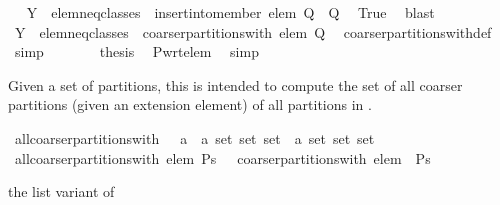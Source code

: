 \begin{isabellebody}
\ \isamarkupfalse%
\ {\isachardoublequoteopen}{\isacharbraceleft}Y{\isacharbraceright}\ {\isasymunion}\ {\isacharquery}elem{\isacharunderscore}neq{\isacharunderscore}classes\ {\isasymin}\ insert{\isacharunderscore}into{\isacharunderscore}member\ elem\ {\isacharquery}Q\ {\isacharbackquote}\ {\isacharquery}Q{\isachardoublequoteclose}\ \isamarkupfalse%
\ True\ \isamarkupfalse%
\ blast\isanewline
\ \ \ \ \isamarkupfalse%
\ \isamarkupfalse%
\ {\isachardoublequoteopen}{\isacharbraceleft}Y{\isacharbraceright}\ {\isasymunion}\ {\isacharquery}elem{\isacharunderscore}neq{\isacharunderscore}classes\ {\isasymin}\ coarser{\isacharunderscore}partitions{\isacharunderscore}with\ elem\ {\isacharquery}Q{\isachardoublequoteclose}\ \isamarkupfalse%
\ coarser{\isacharunderscore}partitions{\isacharunderscore}with{\isacharunderscore}def\ \isamarkupfalse%
\ simp\isanewline
\ \ \ \ \isamarkupfalse%
\ \isamarkupfalse%
\ {\isacharquery}thesis\ \isamarkupfalse%
\ P{\isacharunderscore}wrt{\isacharunderscore}elem\ \isamarkupfalse%
\ simp\isanewline
\ \ \isamarkupfalse%
\isanewline
{}\isamarkupfalse%
%
\endisatagproof
{\isafoldproof}%
%
\isadelimproof
%
\endisadelimproof
%
\begin{isamarkuptext}%
Given a set  of partitions, this is intended to compute the set of all coarser
  partitions (given an extension element) of all partitions in .%
\end{isamarkuptext}%
\isamarkuptrue%
\isamarkupfalse%
\ all{\isacharunderscore}coarser{\isacharunderscore}partitions{\isacharunderscore}with\ {\isacharcolon}{\isacharcolon}\ {\isachardoublequoteopen}\ {\isacharprime}a\ {\isasymRightarrow}\ {\isacharprime}a\ set\ set\ set\ {\isasymRightarrow}\ {\isacharprime}a\ set\ set\ set{\isachardoublequoteclose}\isanewline
{}\ {\isachardoublequoteopen}all{\isacharunderscore}coarser{\isacharunderscore}partitions{\isacharunderscore}with\ elem\ Ps\ {\isacharequal}\ {\isasymUnion}\ {\isacharparenleft}coarser{\isacharunderscore}partitions{\isacharunderscore}with\ elem\ {\isacharbackquote}\ Ps{\isacharparenright}{\isachardoublequoteclose}%
\begin{isamarkuptext}%
the list variant of %
\end{isamarkuptext}%
\isamarkuptrue%

\end{isabellebody}
